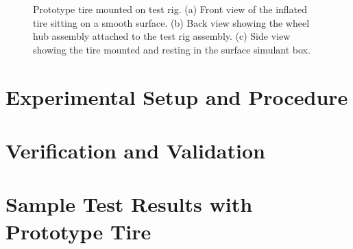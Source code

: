 \documentclass{article}
\begin{document}
\begin{figure}[hbt!]
\begin{minipage}{0.32\textwidth}
    \end{minipage}
        \begin{minipage}{0.32\textwidth}
        \centering
    \end{minipage}
    \caption{Prototype tire mounted on test rig. (a) Front view of the inflated tire sitting on a smooth surface. (b) Back view showing the wheel hub assembly attached to the test rig assembly. (c) Side view showing the tire mounted and resting in the surface simulant box.}
    \label{tire_on_rig}
\end{figure}

\section{Experimental Setup and Procedure}


\section{Verification and Validation}


\section{Sample Test Results with Prototype Tire}
\end{document}
